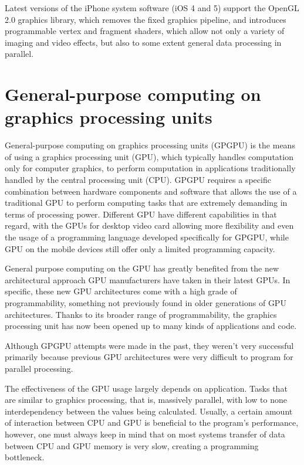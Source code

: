 Latest versions of the iPhone system software (iOS 4 and 5) support the OpenGL 2.0 graphics library, which removes the fixed graphics pipeline, and introduces programmable vertex and fragment shaders, which allow not only a variety of imaging and video effects, but also to some extent general data processing in parallel. 

\section{General-purpose computing on graphics processing units}

General-purpose computing on graphics processing units (GPGPU) is the means of using a graphics processing unit (GPU), which typically handles computation only for computer graphics, to perform computation in applications traditionally handled by the central processing unit (CPU). 
 GPGPU requires a specific combination  between hardware components and software that allows the use of a traditional GPU to perform computing tasks that are extremely demanding in terms of processing power. Different GPU have different capabilities in that regard, with the GPUs for desktop video card allowing more flexibility and even the usage of a programming language developed specifically for GPGPU, while GPU on the mobile devices still offer only a limited programming capacity.  

General purpose computing on the GPU has greatly benefited from the new architectural approach GPU manufacturers have taken in their latest GPUs. In specific, these new GPU architectures come with a high grade of programmability, something not previously found in older generations of GPU architectures. Thanks to its broader range of programmability, the graphics processing unit has now been opened up to many kinds of applications and code.

Although GPGPU attempts were made in the past, they weren't very successful primarily because previous GPU architectures were very difficult to program for parallel processing. 

The effectiveness of the GPU usage largely depends on application. Tasks that are similar to graphics processing, that is, massively parallel, with low to none interdependency between the values being calculated. 
Usually, a certain amount of interaction between CPU and GPU is beneficial to the program's performance, however, one must always keep in mind that on most systems transfer of data between CPU and GPU memory is very slow, creating a programming bottleneck. 

